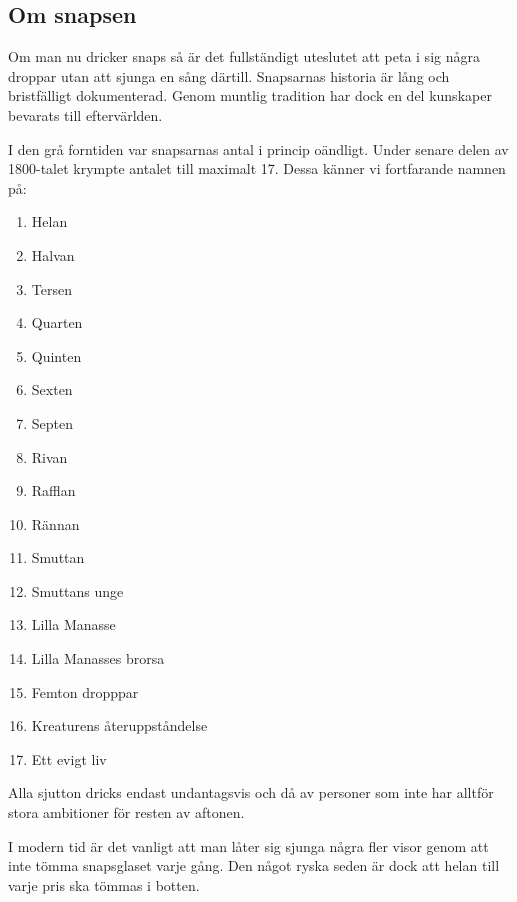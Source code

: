 

\pagestyle{Snapsvisor}



\subsection{\textbf{Om snapsen}}


Om man nu dricker snaps så är det fullständigt uteslutet att peta i
sig några droppar utan att sjunga en sång därtill.
Snapsarnas historia är lång och bristfälligt dokumenterad. Genom
muntlig tradition har dock en del kunskaper bevarats till
eftervärlden.

I den grå forntiden var snapsarnas antal i princip oändligt. Under
senare delen av 1800-talet krympte antalet till maximalt 17. Dessa
känner vi fortfarande namnen på: 

\begin{multicols}{2}[]
\begin{enumerate}
    \item Helan
    \item Halvan
    \item Tersen
    \item Quarten
    \item Quinten
    \item Sexten
    \item Septen
    \item Rivan
    \item Rafflan
    \item Rännan
    \item Smuttan
    \item Smuttans unge
    \item Lilla Manasse
    \item Lilla Manasses brorsa
    \item Femton dropppar
    \item Kreaturens återuppståndelse
    \item Ett evigt liv    
\end{enumerate}
\end{multicols}

Alla sjutton dricks endast undantagsvis och då av personer som
inte har alltför stora ambitioner för resten av aftonen.

I modern tid är det vanligt att man låter sig sjunga några fler visor
genom att inte tömma snapsglaset varje gång. Den något ryska
seden är dock att helan till varje pris ska tömmas i botten.

